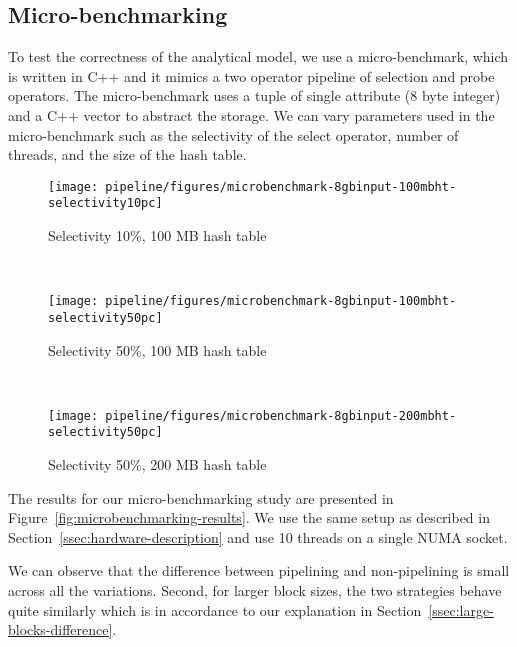 \subsection{Micro-benchmarking}
To test the correctness of the analytical model, we use a micro-benchmark, which is written in C++ and it mimics a two operator pipeline of selection and probe operators. 
The micro-benchmark uses a tuple of single attribute (8 byte integer) and a C++ vector to abstract the storage.
We can vary parameters used in the micro-benchmark such as the selectivity of the select operator, number of threads, and the size of the hash table.

\begin{figure*}[t]
	\centering
	\begin{subfigure}[ht]{0.32\textwidth}
		\texttt{[image: pipeline/figures/microbenchmark-8gbinput-100mbht-selectivity10pc]}	
		\caption{Selectivity 10\%, 100 MB hash table}
	\end{subfigure}
	~
	\begin{subfigure}[ht]{0.32\textwidth}
		\texttt{[image: pipeline/figures/microbenchmark-8gbinput-100mbht-selectivity50pc]}	
		\caption{Selectivity 50\%, 100 MB hash table}		
	\end{subfigure}
	~
	\begin{subfigure}[ht]{0.32\textwidth}
		\texttt{[image: pipeline/figures/microbenchmark-8gbinput-200mbht-selectivity50pc]}	
		\caption{Selectivity 50\%, 200 MB hash table}
	\end{subfigure}
	\caption{\textbf{Results of the micro-benchmarking experiments. The size of the base table is 8 GB. }}
	\label{fig:microbenchmarking-results}
\end{figure*}

The results for our micro-benchmarking study are presented in Figure~\ref{fig:microbenchmarking-results}. 
We use the same setup as described in Section~\ref{ssec:hardware-description} and use 10 threads on a single NUMA socket.

We can observe that the difference between pipelining and non-pipelining is small across all the variations.
Second, for larger block sizes, the two strategies behave quite similarly which is in accordance to our explanation in Section~\ref{ssec:large-blocks-difference}.